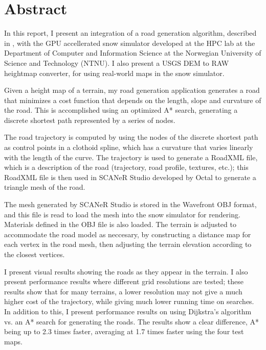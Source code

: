 \chapter*{Abstract}

In this report, I present an integration of a road generation algorithm, described in \cite{roadgen}, with the GPU accellerated snow simulator developed at the HPC lab at the Department of Computer and Information Science at the Norwegian University of Science and Technology (NTNU). I also present a USGS DEM to RAW heightmap converter, for using real-world maps in the snow simulator. 

Given a height map of a terrain, my road generation application generates a road that minimizes a cost function that depends on the length, slope and curvature of the road. This is accomplished using an optimized A* search, generating a discrete shortest path represented by a series of nodes. 

The road trajectory is computed by using the nodes of the discrete shortest path as control points in a clothoid spline, which has a curvature that varies linearly with the length of the curve. The trajectory is used to generate a RoadXML file, which is a description of the road (trajectory, road profile, textures, etc.); this RoadXML file is then used in SCANeR Studio developed by Octal\cite{octalstudio} to generate a triangle mesh of the road. 

The mesh generated by SCANeR Studio is stored in the Wavefront OBJ format, and this file is read to load the mesh into the snow simulator for rendering. Materials defined in the OBJ file is also loaded. The terrain is adjusted to accommodate the road model as neccesary, by constructing a distance map for each vertex in the road mesh, then adjusting the terrain elevation according to the closest vertices.

I present visual results showing the roads as they appear in the terrain. I also present performance results where different grid resolutions are tested; these results show that for many terrains, a lower resolution may not give a much higher cost of the trajectory, while giving much lower running time on searches. In addition to this, I present performance results on using Dijkstra's algorithm vs. an A* search for generating the roads. The results show a clear difference, A* being up to 2.3 times faster, averaging at 1.7 times faster using the four test maps.

